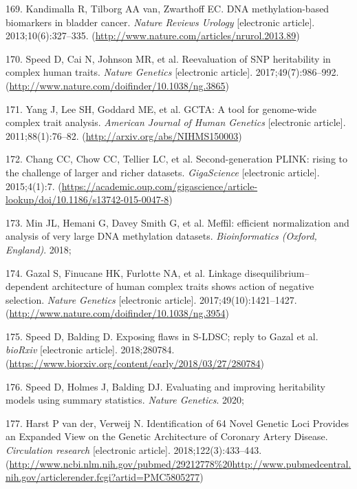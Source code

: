 \documentclass[11pt,oneside]{bristolthesis}
\newenvironment{cslreferences}%
  {}%
  {\par}
\begin{document}
\begin{cslreferences}
\leavevmode\hypertarget{ref-Kandimalla2013}{}%
169. Kandimalla R, Tilborg AA van, Zwarthoff EC. DNA methylation-based biomarkers in bladder cancer. \emph{Nature Reviews Urology} {[}electronic article{]}. 2013;10(6):327--335. (\url{http://www.nature.com/articles/nrurol.2013.89})

\leavevmode\hypertarget{ref-Speed2017}{}%
170. Speed D, Cai N, Johnson MR, et al. Reevaluation of SNP heritability in complex human traits. \emph{Nature Genetics} {[}electronic article{]}. 2017;49(7):986--992. (\url{http://www.nature.com/doifinder/10.1038/ng.3865})

\leavevmode\hypertarget{ref-Yang2011}{}%
171. Yang J, Lee SH, Goddard ME, et al. GCTA: A tool for genome-wide complex trait analysis. \emph{American Journal of Human Genetics} {[}electronic article{]}. 2011;88(1):76--82. (\url{http://arxiv.org/abs/NIHMS150003})

\leavevmode\hypertarget{ref-Chang2015}{}%
172. Chang CC, Chow CC, Tellier LC, et al. Second-generation PLINK: rising to the challenge of larger and richer datasets. \emph{GigaScience} {[}electronic article{]}. 2015;4(1):7. (\url{https://academic.oup.com/gigascience/article-lookup/doi/10.1186/s13742-015-0047-8})

\leavevmode\hypertarget{ref-Min2018}{}%
173. Min JL, Hemani G, Davey Smith G, et al. Meffil: efficient normalization and analysis of very large DNA methylation datasets. \emph{Bioinformatics (Oxford, England)}. 2018;

\leavevmode\hypertarget{ref-Gazal2017}{}%
174. Gazal S, Finucane HK, Furlotte NA, et al. Linkage disequilibrium--dependent architecture of human complex traits shows action of negative selection. \emph{Nature Genetics} {[}electronic article{]}. 2017;49(10):1421--1427. (\url{http://www.nature.com/doifinder/10.1038/ng.3954})

\leavevmode\hypertarget{ref-Speed2018}{}%
175. Speed D, Balding D. Exposing flaws in S-LDSC; reply to Gazal et al. \emph{bioRxiv} {[}electronic article{]}. 2018;280784. (\url{https://www.biorxiv.org/content/early/2018/03/27/280784})

\leavevmode\hypertarget{ref-Speed2020}{}%
176. Speed D, Holmes J, Balding DJ. Evaluating and improving heritability models using summary statistics. \emph{Nature Genetics}. 2020;

\leavevmode\hypertarget{ref-VanderHarst2018}{}%
177. Harst P van der, Verweij N. Identification of 64 Novel Genetic Loci Provides an Expanded View on the Genetic Architecture of Coronary Artery Disease. \emph{Circulation research} {[}electronic article{]}. 2018;122(3):433--443. (\url{http://www.ncbi.nlm.nih.gov/pubmed/29212778\%20http://www.pubmedcentral.nih.gov/articlerender.fcgi?artid=PMC5805277})


\end{cslreferences}
\end{document}
